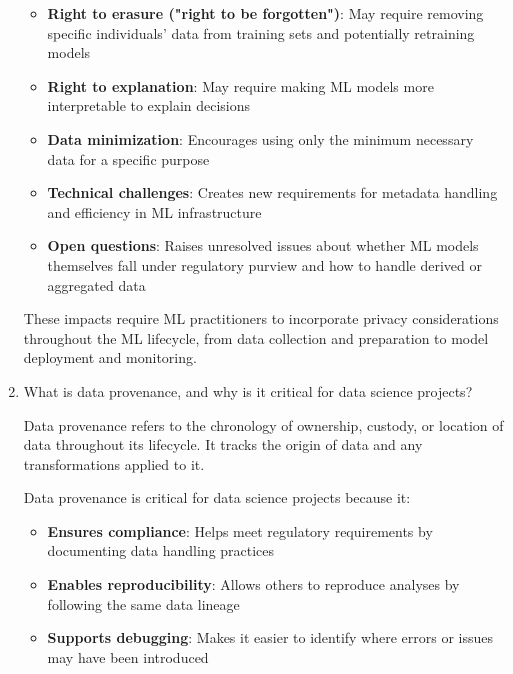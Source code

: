 \documentclass[12pt]{article}
\begin{document}
\begin{enumerate}
\begin{tcolorbox}[colback=blue!5!white,colframe=blue!75!black,title={Solution}]
\begin{itemize}
        \item \textbf{Right to erasure ("right to be forgotten")}: May require removing specific individuals' data from training sets and potentially retraining models
        
        \item \textbf{Right to explanation}: May require making ML models more interpretable to explain decisions
        
        \item \textbf{Data minimization}: Encourages using only the minimum necessary data for a specific purpose
        
        \item \textbf{Technical challenges}: Creates new requirements for metadata handling and efficiency in ML infrastructure
        
        \item \textbf{Open questions}: Raises unresolved issues about whether ML models themselves fall under regulatory purview and how to handle derived or aggregated data
    \end{itemize}
    
    These impacts require ML practitioners to incorporate privacy considerations throughout the ML lifecycle, from data collection and preparation to model deployment and monitoring.
    \end{tcolorbox}
    
    \item What is data provenance, and why is it critical for data science projects?
    
    \begin{tcolorbox}[colback=blue!5!white,colframe=blue!75!black,title={Solution}]
    Data provenance refers to the chronology of ownership, custody, or location of data throughout its lifecycle. It tracks the origin of data and any transformations applied to it.
    
    Data provenance is critical for data science projects because it:
    
    \begin{itemize}
        \item \textbf{Ensures compliance}: Helps meet regulatory requirements by documenting data handling practices
        
        \item \textbf{Enables reproducibility}: Allows others to reproduce analyses by following the same data lineage
        
        \item \textbf{Supports debugging}: Makes it easier to identify where errors or issues may have been introduced
        

\end{itemize}
\end{tcolorbox}
\end{enumerate}
\end{document}
